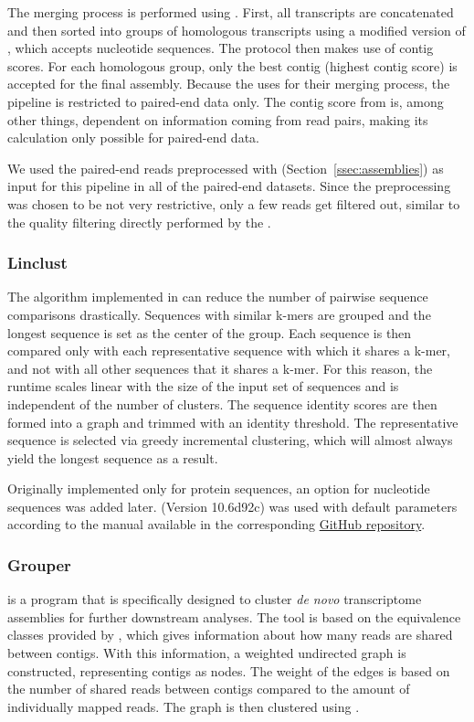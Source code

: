 \documentclass[12pt,a4paper,english]{article}
\begin{document}
	The merging process is performed using \orthofuse. First, all transcripts are concatenated and then sorted into groups of homologous transcripts using a modified version of \orthofinder \citep{OrthoFinder:15}, which accepts nucleotide sequences. The protocol then makes use of  \cite{TransRate:16} contig scores. For each homologous group, only the best contig (highest contig score) is accepted for the final assembly.
	Because the \orp uses \transrate for their merging process, the pipeline is restricted to paired-end data only. The contig score from \transrate is, among other things, dependent on information coming from read pairs, making its calculation only possible for paired-end data.
	
	We used the paired-end reads preprocessed with \fastp (Section~\ref{ssec:assemblies}) as input for this pipeline in all of the paired-end datasets. Since the \fastp preprocessing was chosen to be not very restrictive, only a few reads get filtered out, similar to the quality filtering directly performed by the \orp.

\subsubsection*{Linclust}
	The algorithm implemented in \linclust \citep{linclust:18} can reduce the number of pairwise sequence comparisons drastically. Sequences with similar k-mers are grouped and the longest sequence is set as the center of the group. 
	Each sequence is then compared only with each representative sequence with which it shares a k-mer, and not with all other sequences that it shares a k-mer. For this reason, the runtime scales linear with the size of the input set of sequences and is independent of the number of clusters.
	The sequence identity scores are then formed into a graph and trimmed with an identity threshold. The representative sequence is selected via greedy incremental clustering, which will almost always yield the longest sequence as a result.

	Originally implemented only for protein sequences, an option for nucleotide sequences was added later. \linclust (Version 10.6d92c) was used with default parameters according to the manual available in the corresponding \href{https://github.com/soedinglab/mmseqs2/wiki#linclust}{GitHub repository}.

\subsubsection*{Grouper}
    \grouper \citep{Grouper:18} is a program that is specifically designed to cluster \textit{de novo} transcriptome assemblies for further downstream analyses. The tool is based on the equivalence classes provided by \salmon \citep{salmon:17}, which gives information about how many reads are shared between contigs. With this information, a weighted undirected graph is constructed, representing contigs as nodes. The weight of the edges is based on the number of shared reads between contigs compared to the amount of individually mapped reads. The graph is then clustered using \mcl \citep{mcl:00}.
\end{document}
